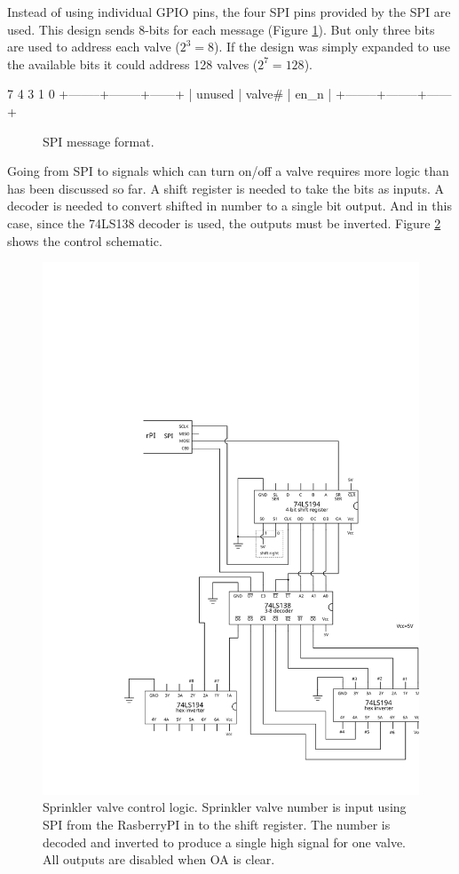 \documentclass{article}
\begin{document}
Instead of using individual GPIO pins, the four SPI pins provided by
the SPI are used.
This design sends 8-bits for each message (Figure \ref{fig:spi}).
But only three bits are used to address each valve ($2^3 = 8$).
If the design was simply expanded to use the available bits
it could address 128 valves ($2^7 = 128$).

\begin{verbbox}
  7      4 3      1      0
 +--------+--------+------+
 | unused | valve# | en_n |
 +--------+--------+------+
\end{verbbox}
\begin{figure}[hbp]
\centering
\theverbbox
\caption{SPI message format.}
\label{fig:spi}
\end{figure}

Going from SPI to signals which can turn on/off a valve requires
more logic than has been discussed so far.
A shift register is needed to take the bits as inputs.
A decoder is needed to convert shifted in number to a single
bit output.
And in this case, since the 74LS138 decoder is used, the outputs
must be inverted.
Figure \ref{fig:control} shows the control schematic.

\begin{figure}[hbp]
\includegraphics[scale=0.85]{figs/control}
\caption{Sprinkler valve control logic.
Sprinkler valve number is input using SPI from the RasberryPI in
to the shift register.  The number is decoded and inverted to produce
a single high signal for one valve.
All outputs are disabled when OA is clear.}\label{fig:control}
\end{figure}
\end{document}
